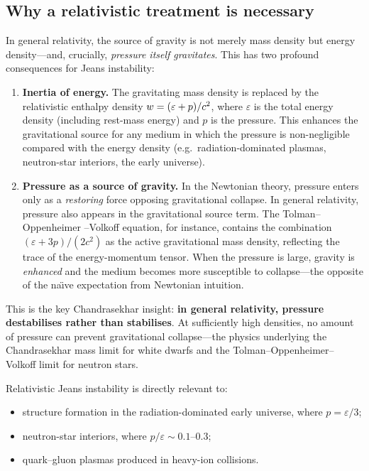 \subsection{Why a relativistic treatment is necessary}
\label{sec:rel-13-119b}

In general relativity, the source of gravity is not merely mass
density but energy density---and, crucially, \emph{pressure itself
gravitates}.  This has two profound consequences for Jeans
instability:

\begin{enumerate}
\item \textbf{Inertia of energy.}  The gravitating mass density
  is replaced by the relativistic enthalpy density
  $w = (\varepsilon + p)/c^{2}$, where $\varepsilon$ is
  the total energy density (including rest-mass energy) and $p$ is
  the pressure.  This enhances the gravitational source for any
  medium in which the pressure is non-negligible compared with the
  energy density (e.g.\ radiation-dominated plasmas, neutron-star
  interiors, the early universe).

\item \textbf{Pressure as a source of gravity.}  In the Newtonian
  theory, pressure enters only as a \emph{restoring} force opposing
  gravitational collapse.  In general relativity, pressure also
  appears in the gravitational source term.  The Tolman--Oppenheimer
  --Volkoff equation, for instance, contains the combination
  $(\varepsilon + 3p)/(2c^{2})$ as the active gravitational mass
  density, reflecting the trace of the energy-momentum tensor.
  When the pressure is large, gravity is \emph{enhanced} and the
  medium becomes more susceptible to collapse---the opposite of the
  na\"{\i}ve expectation from Newtonian intuition.
\end{enumerate}

This is the key Chandrasekhar insight: \textbf{in general
relativity, pressure destabilises rather than stabilises}.  At
sufficiently high densities, no amount of pressure can prevent
gravitational collapse---the physics underlying the Chandrasekhar
mass limit for white dwarfs and the Tolman--Oppenheimer--Volkoff
limit for neutron stars.

Relativistic Jeans instability is directly relevant to:
\begin{itemize}
\item structure formation in the radiation-dominated early
  universe, where $p = \varepsilon/3$;
\item neutron-star interiors, where $p/\varepsilon \sim 0.1$--$0.3$;
\item quark--gluon plasmas produced in heavy-ion collisions.
\end{itemize}

